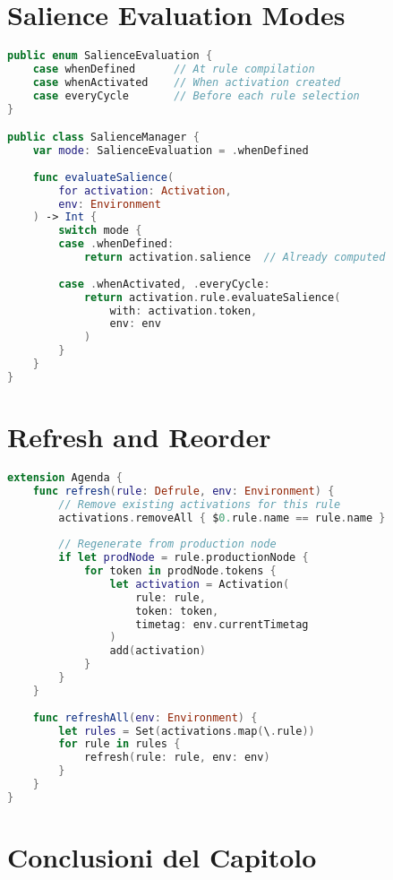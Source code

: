 \section{Salience Evaluation Modes}

\begin{lstlisting}[language=Swift]
public enum SalienceEvaluation {
    case whenDefined      // At rule compilation
    case whenActivated    // When activation created
    case everyCycle       // Before each rule selection
}

public class SalienceManager {
    var mode: SalienceEvaluation = .whenDefined
    
    func evaluateSalience(
        for activation: Activation,
        env: Environment
    ) -> Int {
        switch mode {
        case .whenDefined:
            return activation.salience  // Already computed
            
        case .whenActivated, .everyCycle:
            return activation.rule.evaluateSalience(
                with: activation.token,
                env: env
            )
        }
    }
}
\end{lstlisting}

\section{Refresh and Reorder}

\begin{lstlisting}[language=Swift]
extension Agenda {
    func refresh(rule: Defrule, env: Environment) {
        // Remove existing activations for this rule
        activations.removeAll { $0.rule.name == rule.name }
        
        // Regenerate from production node
        if let prodNode = rule.productionNode {
            for token in prodNode.tokens {
                let activation = Activation(
                    rule: rule,
                    token: token,
                    timetag: env.currentTimetag
                )
                add(activation)
            }
        }
    }
    
    func refreshAll(env: Environment) {
        let rules = Set(activations.map(\.rule))
        for rule in rules {
            refresh(rule: rule, env: env)
        }
    }
}
\end{lstlisting}

\section{Conclusioni del Capitolo}

